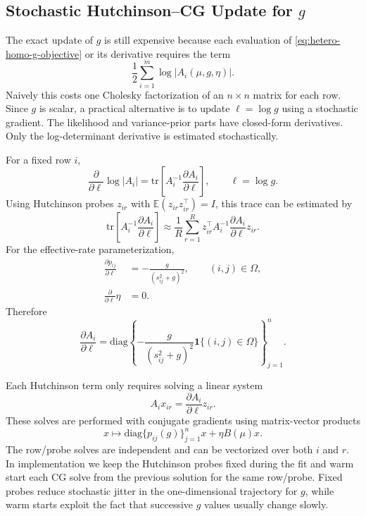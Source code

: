 \documentclass[11pt]{article}
\begin{document}
\subsection{Stochastic Hutchinson--CG Update for $g$}

The exact update of $g$ is still expensive because each evaluation of
\eqref{eq:hetero-homo-g-objective} or its derivative requires the term
\begin{equation}
    \frac{1}{2}\sum_{i=1}^m \log |A_i(\mu,g,\eta)|.
\end{equation}
Naively this costs one Cholesky factorization of an $n\times n$ matrix for each
row.  Since $g$ is scalar, a practical alternative is to update $\ell=\log g$
using a stochastic gradient.  The likelihood and variance-prior
parts have closed-form derivatives.  Only the log-determinant derivative is
estimated stochastically.

For a fixed row $i$,
\begin{equation}
    \frac{\partial}{\partial \ell}
    \log |A_i|
        =
        \mathrm{tr}\!\left[
            A_i^{-1}
            \frac{\partial A_i}{\partial \ell}
        \right],
        \qquad \ell=\log g .
\end{equation}
Using Hutchinson probes $z_{ir}$ with
$\mathbb{E}(z_{ir}z_{ir}^{\top})=I$, this trace can be estimated by
\begin{equation}
    \mathrm{tr}\!\left[
        A_i^{-1}
        \frac{\partial A_i}{\partial \ell}
    \right]
    \approx
    \frac{1}{R}\sum_{r=1}^R
    z_{ir}^{\top}
    A_i^{-1}
    \frac{\partial A_i}{\partial \ell}
    z_{ir}.
\end{equation}
For the effective-rate parameterization,
\begin{align}
    \frac{\partial p_{ij}}{\partial \ell}
        &=
        -\frac{g}{(s_{ij}^2+g)^2},
        \qquad (i,j)\in\Omega, \\
    \frac{\partial}{\partial \ell}
    \eta
        &=
        0.
\end{align}
Therefore
\begin{equation}
    \frac{\partial A_i}{\partial \ell}
        =
        \mathrm{diag}\!\left\{
            -\frac{g}{(s_{ij}^2+g)^2}
            \mathbf{1}\{(i,j)\in\Omega\}
        \right\}_{j=1}^n .
\end{equation}

Each Hutchinson term only requires solving a linear system
\begin{equation}
    A_i x_{ir}
        =
        \frac{\partial A_i}{\partial \ell}z_{ir}.
\end{equation}
These solves are performed with conjugate gradients using matrix-vector
products
\begin{equation}
    x \mapsto
    \mathrm{diag}\{p_{ij}(g)\}_{j=1}^n x
    +
    \eta B(\mu)x.
\end{equation}
The row/probe solves are independent and can be vectorized over both $i$ and
$r$.  In implementation we keep the Hutchinson probes fixed during the fit and
warm start each CG solve from the previous solution for the same row/probe.
Fixed probes reduce stochastic jitter in the one-dimensional trajectory for
$g$, while warm starts exploit the fact that successive $g$ values usually
change slowly.
\end{document}
